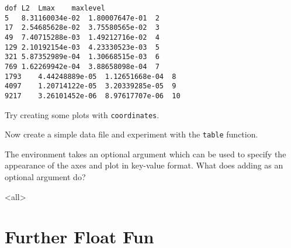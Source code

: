 \begin{verbatim}
dof L2  Lmax    maxlevel
5   8.31160034e-02  1.80007647e-01  2
17  2.54685628e-02  3.75580565e-02  3
49  7.40715288e-03  1.49212716e-02  4
129 2.10192154e-03  4.23330523e-03  5
321 5.87352989e-04  1.30668515e-03  6
769 1.62269942e-04  3.88658098e-04  7
1793    4.44248889e-05  1.12651668e-04  8
4097    1.20714122e-05  3.20339285e-05  9
9217    3.26101452e-06  8.97617707e-06  10
\end{verbatim}

\begin{exercise}
  Try creating some plots with  \texttt{coordinates}.

  Now create a simple data file and experiment with the \texttt{table} function.

  The  environment takes an optional argument which can be used to specify the appearance of the axes and plot in key-value format.
  What does adding  as an optional argument do?
\end{exercise}

\mode<all>
\mode*


\clearpage
\appendix


\section<1-| beamer:0>{Further Float Fun}\label{sec:fff}

